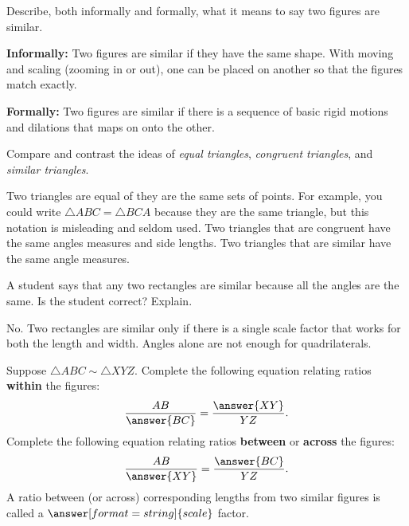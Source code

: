 \documentclass[nooutcomes]{ximera}
\begin{document}
\begin{question}
Describe, both informally and formally, what it means to say two figures are similar.
\begin{freeResponse}
\begin{hint}
\textbf{Informally:}  Two figures are similar if they have the same shape.  With moving and scaling (zooming in or out), one can be placed on another so that the figures match exactly.    

\textbf{Formally:}  Two figures are similar if there is a sequence of basic rigid motions and dilations that maps on onto the other.  
\end{hint}
\end{freeResponse}
\end{question}


\begin{question}
Compare and contrast the ideas of \textit{equal triangles},
  \textit{congruent triangles}, and \textit{similar triangles}.
\begin{freeResponse}
\begin{hint}
Two triangles are equal of they are the same sets of points.  For example, you could write $\triangle ABC = \triangle BCA$ because they are the same triangle, but this notation is misleading and seldom used.  Two triangles that are congruent have the same angles measures and side lengths.  Two triangles that are similar have the same angle measures.  
\end{hint}
\end{freeResponse}
\end{question}

\begin{question}
A student says that any two rectangles are similar because all the angles are the same.  Is the student correct?  Explain. 
\begin{freeResponse}
\begin{hint}
No.  Two rectangles are similar only if there is a single scale factor that works for both the length and width.  Angles alone are not enough for quadrilaterals.  
\end{hint}
\end{freeResponse}
\end{question}


\begin{question}
Suppose $\triangle ABC \sim \triangle XYZ$.  Complete the following equation relating ratios \textbf{within} the figures: 
\[
\frac{AB}{\answer{BC}} = \frac{\answer{XY}}{YZ}.  
\]
Complete the following equation relating ratios \textbf{between} or \textbf{across} the figures: 
\[
\frac{AB}{\answer{XY}} = \frac{\answer{BC}}{YZ}.  
\]
A ratio between (or across) corresponding lengths from two similar figures is called a $\answer[format=string]{scale}$ factor.  
\end{question}
\end{document}
